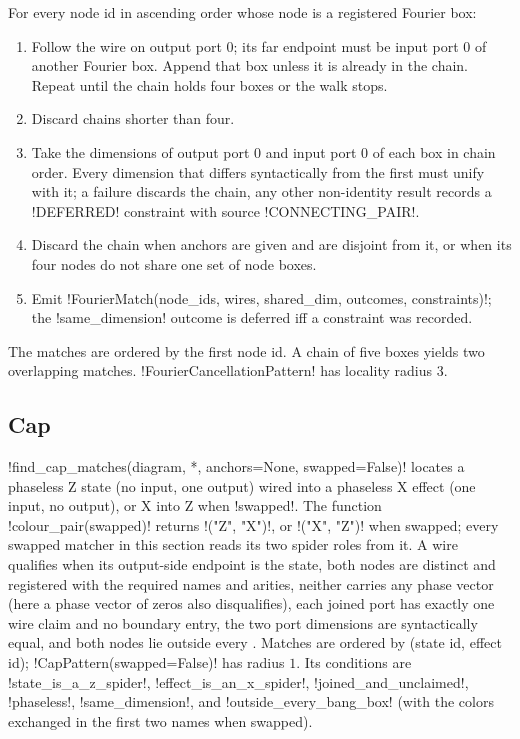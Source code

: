 \begin{algorithm}[$F^4$ matcher]\label{alg:rewriting-f4}
For every node id in ascending order whose node is a registered Fourier box:
\begin{enumerate}
\item Follow the wire on output port $0$; its far endpoint must be input port $0$ of another
  Fourier box. Append that box unless it is already in the chain. Repeat until the chain holds
  four boxes or the walk stops.
\item Discard chains shorter than four.
\item Take the dimensions of output port $0$ and input port $0$ of each box in chain order. Every
  dimension that differs syntactically from the first must unify with it; a failure discards the
  chain, any other non-identity result records a \code!DEFERRED! constraint with source
  \code!CONNECTING_PAIR!.
\item Discard the chain when anchors are given and are disjoint from it, or when its four nodes do
  not share one set of node boxes.
\item Emit \py!FourierMatch(node_ids, wires, shared_dim, outcomes, constraints)!; the
  \code!same_dimension! outcome is deferred iff a constraint was recorded.
\end{enumerate}
\end{algorithm}
The matches are ordered by the first node id. A chain of five boxes yields two overlapping
matches. \py!FourierCancellationPattern! has locality radius $3$.

\subsection{Cap}

\py!find_cap_matches(diagram, *, anchors=None, swapped=False)! locates a phaseless Z state (no
input, one output) wired into a phaseless X effect (one input, no output), or X into Z when
\py!swapped!. The function \py!colour_pair(swapped)! returns \code!("Z", "X")!, or
\code!("X", "Z")! when swapped; every swapped matcher in this section reads its two spider roles
from it. A wire qualifies when its output-side endpoint is the state, both nodes are distinct and
registered with the required names and arities, neither carries any phase vector (here a phase
vector of zeros also disqualifies), each joined port has exactly one wire claim and no boundary
entry, the two port dimensions are syntactically equal, and both nodes lie outside every \bbox{}.
Matches are ordered by (state id, effect id); \py!CapPattern(swapped=False)! has radius $1$. Its
conditions are \code!state_is_a_z_spider!, \code!effect_is_an_x_spider!,
\code!joined_and_unclaimed!, \code!phaseless!, \code!same_dimension!, and
\code!outside_every_bang_box! (with the colors exchanged in the first two names when swapped).


